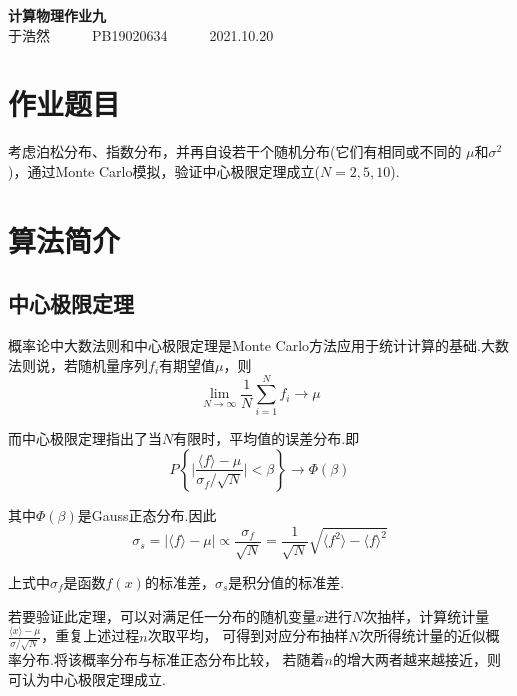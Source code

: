 \documentclass[12pt,a4paper,utf8]{ctexart}
\begin{document}
\begin{center}
    {\LARGE\textbf{计算物理作业九}}\\
    \textrm{于浩然}~~~~~~\textrm{PB19020634}~~~~~~\textrm{2021.10.20}
\end{center}

\section{作业题目}

考虑泊松分布、指数分布，并再自设若干个随机分布(它们有相同或不同的 $\mu$和$\sigma
^2$)，通过Monte Carlo模拟，验证中心极限定理成立($N=2,5,10$).

\section{算法简介}

\subsection{中心极限定理}

概率论中大数法则和中心极限定理是Monte
Carlo方法应用于统计计算的基础.大数法则说，若随机量序列${f_i}$有期望值$\mu$，则
\begin{equation}
    \lim_{N\rightarrow \infty} \frac{1}{N} \sum_{i=1}^{N}f_i \rightarrow \mu
\end{equation}

而中心极限定理指出了当$N$有限时，平均值的误差分布.即
\begin{equation}
    P \left\{ \bigg|\frac{\langle f \rangle - \mu}{\sigma_f / \sqrt{N}} \bigg|  <
    \beta\right\} \rightarrow \Phi(\beta)
\end{equation}

其中$\Phi(\beta)$是Gauss正态分布.因此
\begin{equation}
    \sigma_s = \left| \langle f \rangle - \mu \right| \propto
    \frac{\sigma_f}{\sqrt{N}} = \frac{1}{\sqrt{N}} 
    \sqrt{\langle f^2 \rangle - \langle f \rangle ^2}
\end{equation}

上式中$\sigma_f$是函数$f(x)$的标准差，$\sigma_s$是积分值的标准差.

若要验证此定理，可以对满足任一分布的随机变量$x$进行$N$次抽样，计算统计量
$\frac{\langle x \rangle - \mu}{\sigma / \sqrt{N}}$，重复上述过程$n$次取平均，
可得到对应分布抽样$N$次所得统计量的近似概率分布.将该概率分布与标准正态分布比较，
若随着$n$的增大两者越来越接近，则可认为中心极限定理成立.
\end{document}
